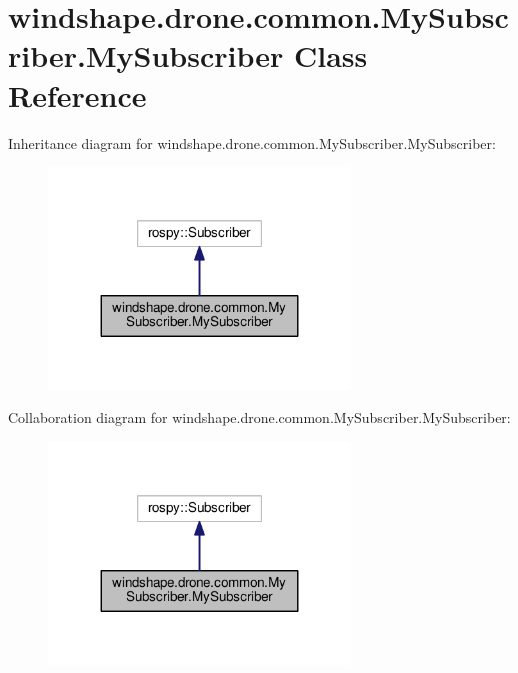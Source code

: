 \hypertarget{classwindshape_1_1drone_1_1common_1_1_my_subscriber_1_1_my_subscriber}{}\section{windshape.\+drone.\+common.\+My\+Subscriber.\+My\+Subscriber Class Reference}
\label{classwindshape_1_1drone_1_1common_1_1_my_subscriber_1_1_my_subscriber}


Inheritance diagram for windshape.\+drone.\+common.\+My\+Subscriber.\+My\+Subscriber\+:\nopagebreak
\begin{figure}[H]
\begin{center}
\leavevmode
\includegraphics[width=227pt]{classwindshape_1_1drone_1_1common_1_1_my_subscriber_1_1_my_subscriber__inherit__graph}
\end{center}
\end{figure}


Collaboration diagram for windshape.\+drone.\+common.\+My\+Subscriber.\+My\+Subscriber\+:\nopagebreak
\begin{figure}[H]
\begin{center}
\leavevmode
\includegraphics[width=227pt]{classwindshape_1_1drone_1_1common_1_1_my_subscriber_1_1_my_subscriber__coll__graph}
\end{center}
\end{figure}
